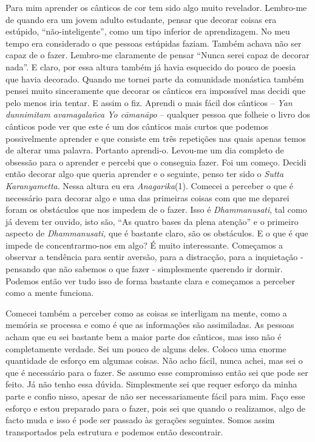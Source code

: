 Para mim aprender os cânticos de cor tem sido algo muito revelador.
Lembro-me de quando era um jovem adulto estudante, pensar que decorar
coisas era estúpido, ``não-inteligente'', como um tipo inferior de
aprendizagem. No meu tempo era considerado o que pessoas estúpidas
faziam. Também achava não ser capaz de o fazer. Lembro-me claramente de
pensar ``Nunca serei capaz de decorar nada''. E claro, por essa altura
também já havia esquecido do pouco de poesia que havia decorado. Quando
me tornei parte da comunidade monástica também pensei muito sinceramente
que decorar os cânticos era impossível mas decidi que pelo menos iria
tentar. E assim o fiz. Aprendi o mais fácil dos cânticos -- \emph{Yan
dunnimitam avamagalañca Yo cāmanāpo} -- qualquer pessoa que folheie o
livro dos cânticos pode ver que este é um dos cânticos mais curtos que
podemos possivelmente aprender e que consiste em três repetições nas
quais apenas temos de alterar uma palavra. Portanto aprendi-o. Levou-me
um dia completo de obsessão para o aprender e percebi que o conseguia
fazer. Foi um começo. Decidi então decorar algo que queria aprender e o
seguinte, penso ter sido o \emph{Sutta Karanyametta}. Nessa altura eu
era \emph{Anagarika}(1). Comecei a perceber o que é necessário para
decorar algo e uma das primeiras coisas com que me deparei foram os
obstáculos que nos impedem de o fazer. Isso é \emph{Dhammanusati}, tal
como já devem ter ouvido, isto são, ``As quatro bases da plena atenção''
e o primeiro aspecto de \emph{Dhammanusati,} que é bastante claro, são
os obstáculos. E o que é que impede de concentrarmo-nos em algo? É muito
interessante. Começamos a observar a tendência para sentir aversão, para
a distracção, para a inquietação - pensando que não sabemos o que fazer
- simplesmente querendo ir dormir. Podemos então ver tudo isso de forma
bastante clara e começamos a perceber como a mente funciona.

Comecei também a perceber como as coisas se interligam na mente, como a
memória se processa e como é que as informações são assimiladas. As
pessoas acham que eu sei bastante bem a maior parte dos cânticos, mas
isso não é completamente verdade. Sei um pouco de alguns deles. Coloco
uma enorme quantidade de esforço em algumas coisas. Não acho fácil,
nunca achei, mas sei o que é necessário para o fazer. Se assumo esse
compromisso então sei que pode ser feito. Já não tenho essa dúvida.
Simplesmente sei que requer esforço da minha parte e confio nisso,
apesar de não ser necessariamente fácil para mim. Faço esse esforço e
estou preparado para o fazer, pois sei que quando o realizamos, algo de
facto muda e isso é pode ser passado às gerações seguintes. Somos assim
transportados pela estrutura e podemos então descontrair.

